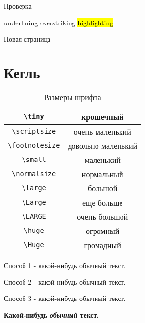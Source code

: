 \documentclass[a4paper,14pt]{article}       %
\begin{document}
Проверка

\ul{underlining}
\st{overstriking}
\hl{highlighting}

\newpage
\pagestyle{empty}                           %

Новая страница


\section{Кегль}

\begin{table}[h!]
    \caption{Размеры шрифта}
    \centering 
    \begin{tabular}{|c|c|}
    \hline  \verb|\tiny|            & \tiny             крошечный           \\
    \hline  \verb|\scriptsize|      & \scriptsize       очень маленький     \\
    \hline  \verb|\footnotesize|    & \footnotesize     довольно маленький  \\
    \hline  \verb|\small|           & \small            маленький           \\
    \hline  \verb|\normalsize|      & \normalsize       нормальный          \\ %
    \hline  \verb|\large|           & \large            большой             \\ %
    \hline  \verb|\Large|           & \Large            еще больше          \\ %
    \hline  \verb|\LARGE|           & \LARGE            очень большой       \\ %
    \hline  \verb|\huge|            & \huge             огромный            \\
    \hline  \verb|\Huge|            & \Huge             громадный           \\
    \hline
    \end{tabular}
\end{table}

Способ 1 - какой-нибудь \Large обычный \normalsize текст.

\begin{small}
    Способ 2 - какой-нибудь обычный текст.
\end{small}

Способ 3 - какой-{\Large нибудь} обычный текст.

\textbf{Какой-{\Large нибудь} \textit{обычный} текст.}
\end{document}
